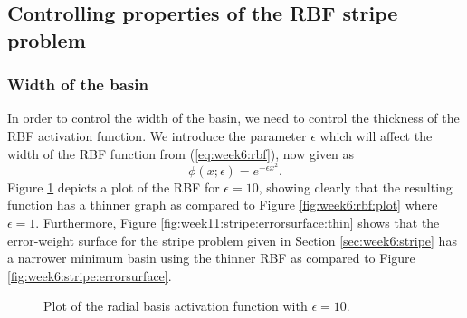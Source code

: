 \documentclass{article}
\begin{document}
\subsection{Controlling properties of the RBF stripe problem}
\subsubsection{Width of the basin}
In order to control the width of the basin, we need to control the thickness of the RBF activation function. 
We introduce the parameter $\epsilon$ which will affect the width of the RBF function from (\ref{eq:week6:rbf}), now given as
\begin{equation}
    \label{eq:week11:rbf_thickness}
    \phi(x; \epsilon) = e^{-\epsilon x^2}.
\end{equation}
Figure \ref{fig:week11:rbf_thickness:plot} depicts a plot of the RBF for $\epsilon=10$, showing clearly that the resulting function has a thinner graph as compared to Figure \ref{fig:week6:rbf:plot} where $\epsilon=1$.
Furthermore, Figure \ref{fig:week11:stripe:errorsurface:thin} shows that the error-weight surface for the stripe problem given in Section \ref{sec:week6:stripe} has a narrower minimum basin using the thinner RBF as compared to Figure \ref{fig:week6:stripe:errorsurface}.
\begin{figure}[h]
    \centering
    \caption{Plot of the radial basis activation function with $\epsilon=10$.}
    \label{fig:week11:rbf_thickness:plot}
\end{figure}
\end{document}
